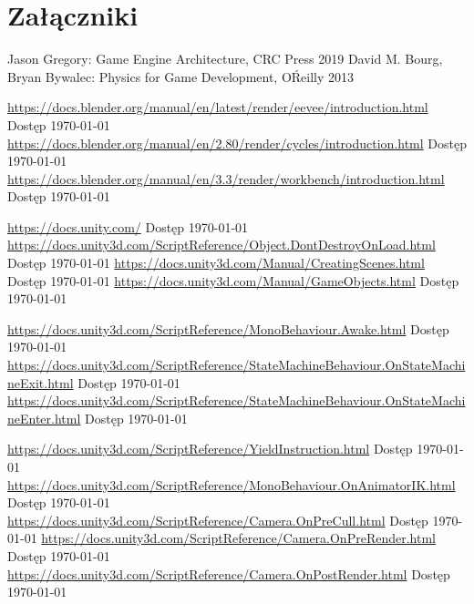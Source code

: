 \documentclass[12pt,twoside]{article}
\begin{document}
\clearpage

\section*{Załączniki}



\clearpage


\begin{thebibliography}{4}
 Jason Gregory: Game Engine Architecture, CRC Press 2019
 David M. Bourg, Bryan Bywalec: Physics for Game Development, O\'Reilly 2013

 \url{https://docs.blender.org/manual/en/latest/render/eevee/introduction.html} Dostęp \today
{} \url{https://docs.blender.org/manual/en/2.80/render/cycles/introduction.html} Dostęp \today
{} \url{https://docs.blender.org/manual/en/3.3/render/workbench/introduction.html} Dostęp \today



 \url{https://docs.unity.com/} Dostęp \today
{} \url{https://docs.unity3d.com/ScriptReference/Object.DontDestroyOnLoad.html} Dostęp \today
{} \url{https://docs.unity3d.com/Manual/CreatingScenes.html} Dostęp \today
{} \url{https://docs.unity3d.com/Manual/GameObjects.html} Dostęp \today

 \url{https://docs.unity3d.com/ScriptReference/MonoBehaviour.Awake.html} Dostęp \today
{} \url{https://docs.unity3d.com/ScriptReference/StateMachineBehaviour.OnStateMachineExit.html} Dostęp \today
{} \url{https://docs.unity3d.com/ScriptReference/StateMachineBehaviour.OnStateMachineEnter.html} Dostęp \today

 \url{https://docs.unity3d.com/ScriptReference/YieldInstruction.html} Dostęp \today
{} \url{https://docs.unity3d.com/ScriptReference/MonoBehaviour.OnAnimatorIK.html} Dostęp \today
{} \url{https://docs.unity3d.com/ScriptReference/Camera.OnPreCull.html} Dostęp \today
{} \url{https://docs.unity3d.com/ScriptReference/Camera.OnPreRender.html} Dostęp \today
{} \url{https://docs.unity3d.com/ScriptReference/Camera.OnPostRender.html} Dostęp \today


\end{thebibliography}
\end{document}

